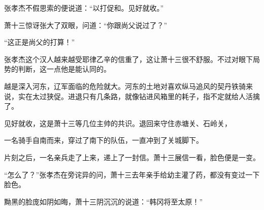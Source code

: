 张孝杰不假思索的便说道：“以打促和。见好就收。”

萧十三惊讶张大了双眼，问道：“你跟尚父说过了？”

“这正是尚父的打算！”

张孝杰这个汉人越来越受耶律乙辛的信重了，这让萧十三很不舒服。不过对眼下局势的判断，这一点他是能认同的。

越是深入河东，辽军面临的危险就大。河东的土地对喜欢纵马追风的契丹铁骑来说，实在太过狭促。进退只有几条路，就像钻进风箱里的耗子，指不定就给人活擒了。

见好就收，这是萧十三等几位主帅的共识。退回来守住赤塘关、石岭关，

一名骑手自南而来，穿过了南下的队伍，一直冲到了关城脚下。

片刻之后，一名亲兵走了上来，递上了一封信。萧十三展信一看，脸色便是一变。

“怎么了？”张孝杰在旁诧异的问，萧十三去年亲手给幼主灌了药，都没有变过一下脸色。

黝黑的脸庞如阴如晦，萧十三阴沉沉的说道：“韩冈将至太原！”
